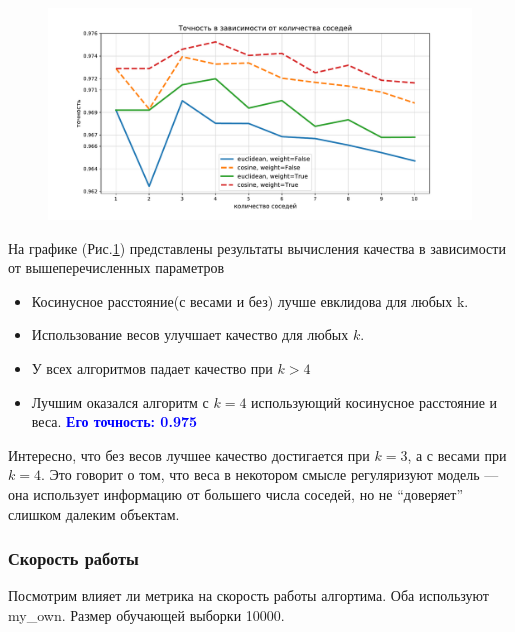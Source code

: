 \documentclass[12pt,fleqn]{article}
\begin{document}
\begin{figure}
    \centering
    \includegraphics[width=17cm]{task2.pdf}
    \caption{}
    \label{pic2}
\end{figure}

На графике (Рис.\ref{pic2}) представлены результаты вычисления качества в зависимости от
вышеперечисленных параметров


\begin{itemize}
    \item Косинусное расстояние(с весами и без) лучше евклидова для любых k.
    \item Использование весов улучшает качество для любых $k$.
    \item У всех алгоритмов падает качество при $k>4$
    \item Лучшим оказался алгоритм с $k=4$ использующий косинусное расстояние и веса.
    \textcolor{blue}{\textbf{Его точность: 0.975}}
\end{itemize}

Интересно, что без весов лучшее качество достигается при $k=3$, а с весами  при $k=4$. 
Это говорит о том, что веса в некотором смысле регуляризуют модель --- она
использует информацию от большего числа соседей, но не ``доверяет'' слишком далеким объектам.

\newpage
\subsubsection{Скорость работы}
Посмотрим влияет ли метрика на скорость работы алгортима. Оба используют my\_own.
Размер обучающей выборки 10000.
\end{document}
